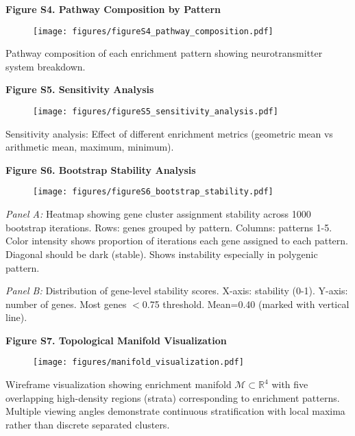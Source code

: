 \documentclass[12pt,letterpaper]{article}
\theoremstyle{definition}
\theoremstyle{remark}
\begin{document}
\vspace{1em}

\textbf{Figure S4. Pathway Composition by Pattern}

\begin{figure}[H]
\centering
\texttt{[image: figures/figureS4\_pathway\_composition.pdf]}
\end{figure}

Pathway composition of each enrichment pattern showing neurotransmitter system breakdown.

\vspace{1em}

\textbf{Figure S5. Sensitivity Analysis}

\begin{figure}[H]
\centering
\texttt{[image: figures/figureS5\_sensitivity\_analysis.pdf]}
\end{figure}

Sensitivity analysis: Effect of different enrichment metrics (geometric mean vs arithmetic mean, maximum, minimum).

\vspace{1em}

\textbf{Figure S6. Bootstrap Stability Analysis}

\begin{figure}[H]
\centering
\texttt{[image: figures/figureS6\_bootstrap\_stability.pdf]}
\end{figure}

\textit{Panel A:} Heatmap showing gene cluster assignment stability across 1000 bootstrap iterations. Rows: genes grouped by pattern. Columns: patterns 1-5. Color intensity shows proportion of iterations each gene assigned to each pattern. Diagonal should be dark (stable). Shows instability especially in polygenic pattern.

\textit{Panel B:} Distribution of gene-level stability scores. X-axis: stability (0-1). Y-axis: number of genes. Most genes $<$0.75 threshold. Mean=0.40 (marked with vertical line).

\vspace{1em}

\textbf{Figure S7. Topological Manifold Visualization}

\begin{figure}[H]
\centering
\texttt{[image: figures/manifold\_visualization.pdf]}
\end{figure}

Wireframe visualization showing enrichment manifold $\mathcal{M} \subset \mathbb{R}^4$ with five overlapping high-density regions (strata) corresponding to enrichment patterns. Multiple viewing angles demonstrate continuous stratification with local maxima rather than discrete separated clusters.

\newpage




\end{document}
